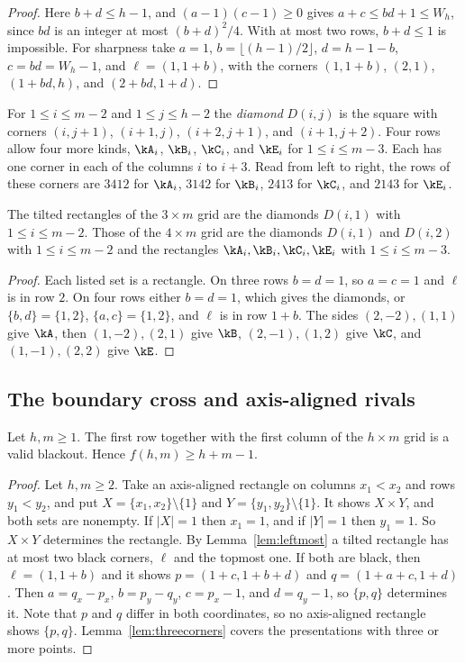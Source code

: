 \begin{proof}
Here $b+d\le h-1$, and $(a-1)(c-1)\ge0$ gives $a+c\le bd+1\le W_h$, since $bd$ is an integer at most $(b+d)^2/4$. With at most two rows, $b+d\le1$ is impossible. For sharpness take $a=1$, $b=\lfloor(h-1)/2\rfloor$, $d=h-1-b$, $c=bd=W_h-1$, and $\ell=(1,1+b)$, with the corners $(1,1+b)$, $(2,1)$, $(1+bd,h)$, and $(2+bd,1+d)$.
\end{proof}

For $1\le i\le m-2$ and $1\le j\le h-2$ the \emph{diamond} $D(i,j)$ is the square with corners $(i,j+1)$, $(i+1,j)$, $(i+2,j+1)$, and $(i+1,j+2)$. Four rows allow four more kinds, $\kA_i$, $\kB_i$, $\kC_i$, and $\kE_i$ for $1\le i\le m-3$. Each has one corner in each of the columns $i$ to $i+3$. Read from left to right, the rows of these corners are $3412$ for $\kA_i$, $3142$ for $\kB_i$, $2413$ for $\kC_i$, and $2143$ for $\kE_i$.

\begin{lemma}\label{lem:tilted-narrow}
The tilted rectangles of the $3\times m$ grid are the diamonds $D(i,1)$ with $1\le i\le m-2$. Those of the $4\times m$ grid are the diamonds $D(i,1)$ and $D(i,2)$ with $1\le i\le m-2$ and the rectangles $\kA_i,\kB_i,\kC_i,\kE_i$ with $1\le i\le m-3$.
\end{lemma}

\begin{proof}
Each listed set is a rectangle. On three rows $b=d=1$, so $a=c=1$ and $\ell$ is in row $2$. On four rows either $b=d=1$, which gives the diamonds, or $\{b,d\}=\{1,2\}$, $\{a,c\}=\{1,2\}$, and $\ell$ is in row $1+b$. The sides $(2,-2),(1,1)$ give $\kA$, then $(1,-2),(2,1)$ give $\kB$, $(2,-1),(1,2)$ give $\kC$, and $(1,-1),(2,2)$ give $\kE$.
\end{proof}

\subsection{The boundary cross and axis-aligned rivals}

\begin{lemma}\label{lem:cross}
Let $h,m\ge1$. The first row together with the first column of the $h\times m$ grid is a valid blackout. Hence $f(h,m)\ge h+m-1$.
\end{lemma}

\begin{proof}
Let $h,m\ge2$. Take an axis-aligned rectangle on columns $x_1<x_2$ and rows $y_1<y_2$, and put $X=\{x_1,x_2\}\setminus\{1\}$ and $Y=\{y_1,y_2\}\setminus\{1\}$. It shows $X\times Y$, and both sets are nonempty. If $|X|=1$ then $x_1=1$, and if $|Y|=1$ then $y_1=1$. So $X\times Y$ determines the rectangle. By Lemma~\ref{lem:leftmost} a tilted rectangle has at most two black corners, $\ell$ and the topmost one. If both are black, then $\ell=(1,1+b)$ and it shows $p=(1+c,1+b+d)$ and $q=(1+a+c,1+d)$. Then $a=q_x-p_x$, $b=p_y-q_y$, $c=p_x-1$, and $d=q_y-1$, so $\{p,q\}$ determines it. Note that $p$ and $q$ differ in both coordinates, so no axis-aligned rectangle shows $\{p,q\}$. Lemma~\ref{lem:threecorners} covers the presentations with three or more points.
\end{proof}

